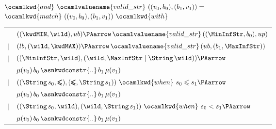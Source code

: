 
        $\ocamlkwd{and} \,\, \ocamlvaluename{valid\_str} \,\, ((v_0,
        b_0), (b_1, v_1)) =$\\
        \hspace*{3mm}
        $\ocamlkwd{match} \,\, ((v_0, b_0), (b_1, v_1)) \,\, \ocamlkwd{with}$ \\ 
        \hspace*{6mm}
        \begin{tabular}{rl}
             & $((\kwdMIN, \wild), ub) \PAarrow \,
               \ocamlvaluename{valid\_str} \, ((\MinInfStr, b_0), up)$\\
           $\mid$
             & $(lb, (\wild, \kwdMAX)) \PAarrow \,
               \ocamlvaluename{valid\_str} \, (ub, (b_1, \MaxInfStr))$\\
           $\mid$
             & $((\MinInfStr, \wild), (\wild, \MaxInfStr \mid \String \,
                \wild)) \PAarrow$\\
             & $\mu(v_0) \, b_0 \,
                \asnkwdconstr{..} \, b_1 \, \mu(v_1)$\\
           $\mid$
             & $((\String \, s_0, \pmb{\leqslant}), (\pmb{\leqslant},
                \String \, s_1)) \,\, \ocamlkwd{when} \,\, s_0
                \leqslant s_1 \PAarrow$\\
             & $\mu(v_0) \, b_0 \,
                \asnkwdconstr{..} \, b_1 \, \mu(v_1)$\\
           $\mid$
             & $((\String \, s_0, \wild), (\wild, \String \, s_1))
                \,\, \ocamlkwd{when} \,\, s_0 < s_1 \PAarrow$\\
             & $\mu(v_0) \, b_0 \,
                \asnkwdconstr{..} \, b_1 \, \mu(v_1)$
        \end{tabular}\\
